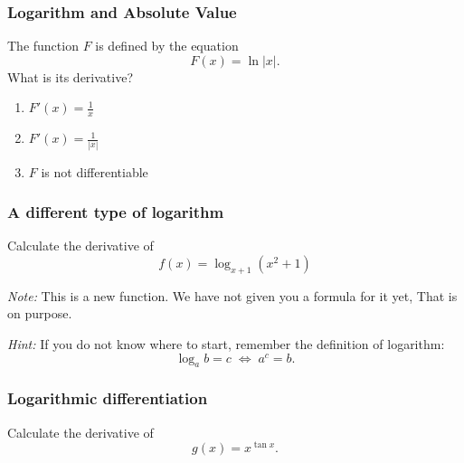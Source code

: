 \begin{frame}[t]
	\frametitle{Logarithm and Absolute Value}

	The function $F$ is defined by the equation
	\[
		F(x) = \ln |x| .
	\]
	What is its derivative?
	\vfill
	\begin{enumerate}
		\item $\displaystyle F'(x) = \frac{1}{x}$
			\vfill

		\item $\displaystyle F'(x) = \frac{1}{|x|}$
			\vfill

		\item $F$ is not differentiable
			\vfill
	\end{enumerate}
\end{frame}

\begin{frame}[t]
	\frametitle{A different type of logarithm}

	Calculate the derivative of
	\[
		f(x) = \log_{x+1}(x^{2}+1)
	\]

	\vfill

	\emph{Note:} This is a new function. We have not given you a formula for it
	yet, That is on purpose.

	\vfill

	\emph{Hint:} If you do not know where to start, remember the definition of
	logarithm:
	\[
		\log_{a}b = c \; \iff \; a^{c}= b.
	\]
\end{frame}

\begin{frame}[t]
	\frametitle{Logarithmic differentiation}

	\vspace{5mm}
	\begin{block}{}
		Calculate the derivative of
		\[
			g(x) = x^{\tan x}.
		\]
	\end{block}
\end{frame}

